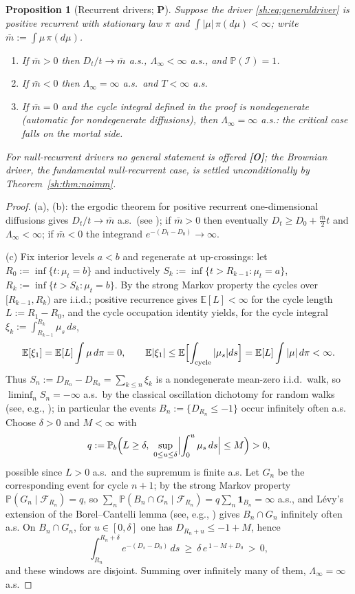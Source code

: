 \documentclass[11pt]{article}
\numberwithin{equation}{section}
\theoremstyle{plain}
\newtheorem{proposition}[theorem]{Proposition}
\theoremstyle{definition}
\theoremstyle{remark}
\newcommand{\E}{\mathbb{E}}
\newcommand{\PP}{\mathbb{P}}
\newcommand{\one}{\mathbf{1}}
\newcommand{\Imm}{\mathcal{I}}
\newcommand{\Fc}{\mathcal{F}}
\begin{document}
\begin{proposition}[Recurrent drivers; \textbf{P}]\label{sh:prop:recurrent}
Suppose the driver \eqref{sh:eq:generaldriver} is positive recurrent with
stationary law $\pi$ and $\int|\mu|\,\pi(d\mu)<\infty$; write
$\bar m:=\int\mu\,\pi(d\mu)$.
\begin{enumerate}[label=\emph{(\alph*)},itemsep=1pt]
\item If $\bar m>0$ then $D_t/t\to\bar m$ a.s., $\Lambda_\infty<\infty$
a.s., and $\PP(\Imm)=1$.
\item If $\bar m<0$ then $\Lambda_\infty=\infty$ a.s.\ and $T<\infty$ a.s.
\item If $\bar m=0$ and the cycle integral defined in the proof is
nondegenerate (automatic for nondegenerate diffusions), then
$\Lambda_\infty=\infty$ a.s.: \emph{the critical case falls on the mortal
side.}
\end{enumerate}
For null-recurrent drivers no general statement is offered
\textbf{[O]}; the Brownian driver, the fundamental null-recurrent case, is
settled unconditionally by Theorem~\ref{sh:thm:noimm}.
\end{proposition}

\begin{proof}
(a), (b): the ergodic theorem for positive recurrent one-dimensional
diffusions gives $D_t/t\to\bar m$ a.s.\ (see \cite[Ch.~X]{RY99}); if
$\bar m>0$ then eventually $D_t\ge D_0+\tfrac{\bar m}2t$ and
$\Lambda_\infty<\infty$; if $\bar m<0$ the integrand
$e^{-(D_t-D_0)}\to\infty$.

(c) Fix interior levels $a<b$ and regenerate at up-crossings: let
$R_0:=\inf\{t:\mu_t=b\}$ and inductively
$S_k:=\inf\{t>R_{k-1}:\mu_t=a\}$, $R_k:=\inf\{t>S_k:\mu_t=b\}$. By the
strong Markov property the cycles over $[R_{k-1},R_k)$ are i.i.d.; positive
recurrence gives $\E[L]<\infty$ for the cycle length
$L:=R_1-R_0$, and the cycle occupation identity yields, for the cycle
integral $\xi_k:=\int_{R_{k-1}}^{R_k}\mu_s\,ds$,
\[
\E[\xi_1]=\E[L]\int\mu\,d\pi=0,\qquad
\E|\xi_1|\le\E\Bigl[\int_{\text{cycle}}|\mu_s|ds\Bigr]
=\E[L]\int|\mu|\,d\pi<\infty .
\]
Thus $S_n:=D_{R_n}-D_{R_0}=\sum_{k\le n}\xi_k$ is a nondegenerate mean-zero
i.i.d.\ walk, so $\liminf_nS_n=-\infty$ a.s.\ by the classical
oscillation dichotomy for random walks (see, e.g., \cite{Dur19});
in particular the events $B_n:=\{D_{R_n}\le-1\}$ occur infinitely often
a.s. Choose $\delta>0$ and $M<\infty$ with
\[
q:=\PP_b\Bigl(L\ge\delta,\ \sup_{0\le u\le\delta}
\Bigl|\int_0^u\mu_s\,ds\Bigr|\le M\Bigr)>0,
\]
possible since $L>0$ a.s.\ and the supremum is finite a.s. Let
$G_n$ be the corresponding event for cycle $n{+}1$; by the strong Markov
property $\PP(G_n\mid\Fc_{R_n})=q$, so
$\sum_n\PP(B_n\cap G_n\mid\Fc_{R_n})=q\sum_n\one_{B_n}=\infty$ a.s., and
L\'evy's extension of the Borel--Cantelli lemma (see, e.g.,
\cite{Dur19}) gives
$B_n\cap G_n$ infinitely often a.s. On $B_n\cap G_n$, for
$u\in[0,\delta]$ one has $D_{R_n+u}\le-1+M$, hence
\[
\int_{R_n}^{R_n+\delta}e^{-(D_s-D_0)}\,ds\ \ge\ \delta\,e^{\,1-M+D_0}\,>\,0 ,
\]
and these windows are disjoint. Summing over infinitely many of them,
$\Lambda_\infty=\infty$ a.s.
\end{proof}
\end{document}

